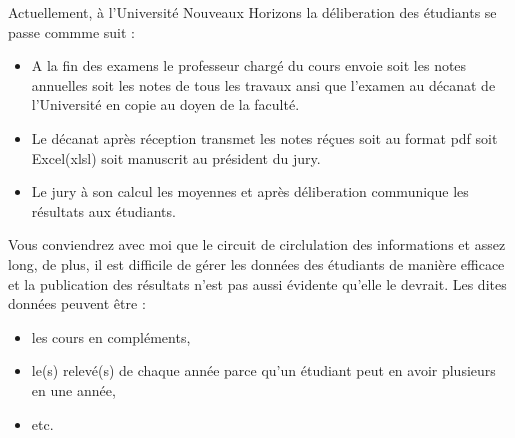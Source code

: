 Actuellement, à l'Université Nouveaux Horizons
la déliberation des étudiants se passe commme suit :

\begin{itemize}
    \item A la fin des examens le professeur chargé du cours envoie soit 
    les notes annuelles soit les notes de tous les travaux ansi que 
    l'examen au décanat de l'Université en copie au doyen de la faculté.
    \item Le décanat après réception transmet les notes réçues soit
    au format pdf soit Excel(xlsl) soit manuscrit au président du jury.
    \item Le jury à son calcul les moyennes et après déliberation
    communique les résultats aux étudiants.
\end{itemize}

Vous conviendrez avec moi que le circuit de circlulation des
informations et assez long, de plus, il est difficile de
gérer les données des étudiants de manière efficace et la publication
des résultats n'est pas aussi évidente qu'elle le devrait. 
Les dites données peuvent être : 
\begin{itemize}
    \item les cours en compléments,
    \item le(s) relevé(s) de chaque année parce qu'un 
    étudiant peut en avoir plusieurs en une année,
    \item etc.
\end{itemize}